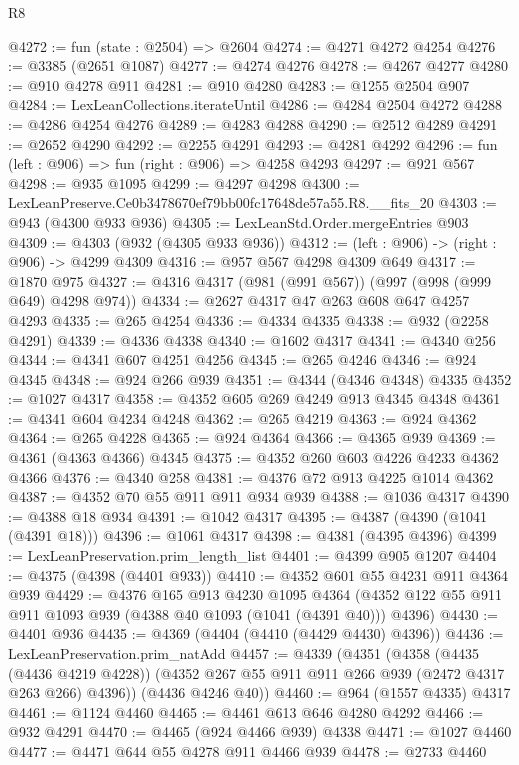 \begin{lexlean}{R8}
\begin{coremodule}
@4272 := fun (state : @2504) => @2604
@4274 := @4271 @4272 @4254
@4276 := @3385 (@2651 @1087)
@4277 := @4274 @4276
@4278 := @4267 @4277
@4280 := @910 @4278 @911
@4281 := @910 @4280
@4283 := @1255 @2504 @907
@4284 := LexLeanCollections.iterateUntil
@4286 := @4284 @2504 @4272
@4288 := @4286 @4254 @4276
@4289 := @4283 @4288
@4290 := @2512 @4289
@4291 := @2652 @4290
@4292 := @2255 @4291
@4293 := @4281 @4292
@4296 := fun (left : @906) => fun (right : @906) => @4258 @4293
@4297 := @921 @567
@4298 := @935 @1095
@4299 := @4297 @4298
@4300 := LexLeanPreserve.Ce0b3478670ef79bb00fc17648de57a55.R8.__fits_20
@4303 := @943 (@4300 @933 @936)
@4305 := LexLeanStd.Order.mergeEntries @903
@4309 := @4303 (@932 (@4305 @933 @936))
@4312 := (left : @906) -> (right : @906) -> @4299 @4309
@4316 := @957 @567 @4298 @4309 @649
@4317 := @1870 @975
@4327 := @4316 @4317 (@981 (@991 @567)) (@997 (@998 (@999 @649) @4298 @974))
@4334 := @2627 @4317 @47 @263 @608 @647 @4257 @4293
@4335 := @265 @4254
@4336 := @4334 @4335
@4338 := @932 (@2258 @4291)
@4339 := @4336 @4338
@4340 := @1602 @4317
@4341 := @4340 @256
@4344 := @4341 @607 @4251 @4256
@4345 := @265 @4246
@4346 := @924 @4345
@4348 := @924 @266 @939
@4351 := @4344 (@4346 @4348) @4335
@4352 := @1027 @4317
@4358 := @4352 @605 @269 @4249 @913 @4345 @4348
@4361 := @4341 @604 @4234 @4248
@4362 := @265 @4219
@4363 := @924 @4362
@4364 := @265 @4228
@4365 := @924 @4364
@4366 := @4365 @939
@4369 := @4361 (@4363 @4366) @4345
@4375 := @4352 @260 @603 @4226 @4233 @4362 @4366
@4376 := @4340 @258
@4381 := @4376 @72 @913 @4225 @1014 @4362
@4387 := @4352 @70 @55 @911 @911 @934 @939
@4388 := @1036 @4317
@4390 := @4388 @18 @934
@4391 := @1042 @4317
@4395 := @4387 (@4390 (@1041 (@4391 @18)))
@4396 := @1061 @4317
@4398 := @4381 (@4395 @4396)
@4399 := LexLeanPreservation.prim_length_list
@4401 := @4399 @905 @1207
@4404 := @4375 (@4398 (@4401 @933))
@4410 := @4352 @601 @55 @4231 @911 @4364 @939
@4429 := @4376
    @165
    @913
    @4230
    @1095
    @4364
    (@4352 @122 @55 @911 @911 @1093 @939 (@4388 @40 @1093 (@1041 (@4391 @40))) @4396)
@4430 := @4401 @936
@4435 := @4369 (@4404 (@4410 (@4429 @4430) @4396))
@4436 := LexLeanPreservation.prim_natAdd
@4457 := @4339
    (@4351
      (@4358
        (@4435 (@4436 @4219 @4228))
        (@4352 @267 @55 @911 @911 @266 @939 (@2472 @4317 @263 @266) @4396))
      (@4436 @4246 @40))
@4460 := @964 (@1557 @4335) @4317
@4461 := @1124 @4460
@4465 := @4461 @613 @646 @4280 @4292
@4466 := @932 @4291
@4470 := @4465 (@924 @4466 @939) @4338
@4471 := @1027 @4460
@4477 := @4471 @644 @55 @4278 @911 @4466 @939
@4478 := @2733 @4460

\end{coremodule}
\end{lexlean}

